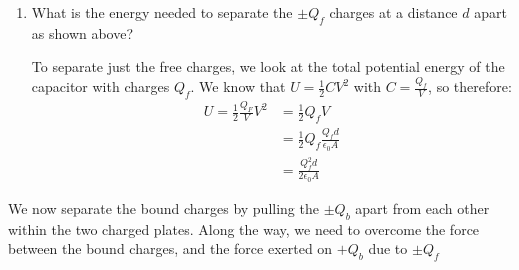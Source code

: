 \documentclass[10pt]{article}
\begin{document}
	\begin{enumerate}[label=\alph*), resume]
		\item What is the energy needed to separate the $\pm Q_f$ charges at a distance $d$ apart as shown above?

			\begin{solution}
				To separate just the free charges, we look at the total potential energy of the capacitor with 
				charges $Q_f$. We know that $U = \frac{1}{2}CV^2$ with $C = \frac{Q_f}{V}$, so therefore: 
				\begin{align*}
					U = \frac{1}{2}\frac{Q_F}{V} V^2 &= \frac{1}{2} Q_f V\\
					&= \frac{1}{2}Q_f \frac{Q_fd}{\epsilon_0A} \\
					&= \frac{Q_f^2 d}{2 \epsilon_0 A}
				\end{align*}
			\end{solution}
	\end{enumerate}

	We now separate the bound charges by pulling the $\pm Q_b$ apart from each other within the two charged 
	plates. Along the way, we need to overcome the force between the bound charges, and the force exerted
	on $+Q_b$ due to $\pm Q_f$
\end{document}
